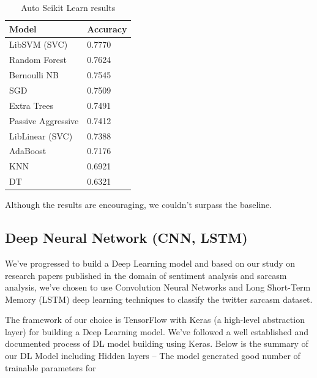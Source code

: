 \documentclass[conference]{IEEEtran}
\begin{document}
\begin{table}[htbp]
	\caption{Auto Scikit Learn results}
	\begin{center}
		\begin{tabular}{|l|l|}
			\hline
			\textbf{Model} & \textbf{Accuracy}\\ \hline
			LibSVM (SVC) & 0.7770 \\ \hline
			Random Forest & 0.7624 \\ \hline
			Bernoulli NB & 0.7545 \\ \hline
			SGD & 0.7509 \\ \hline
			Extra Trees & 0.7491 \\ \hline
			Passive Aggressive & 0.7412 \\ \hline
			LibLinear (SVC) & 0.7388 \\ \hline
			AdaBoost & 0.7176 \\ \hline
			KNN & 0.6921 \\ \hline
			DT & 0.6321 \\ \hline								
		\end{tabular}
		\label{tab2}
	\end{center}
\end{table}


Although the results are encouraging, we couldn’t surpass the baseline.

\subsection{Deep Neural Network (CNN, LSTM)}

We’ve progressed to build a Deep Learning model and based on our study on research papers published in the domain of sentiment analysis and sarcasm analysis, we’ve chosen to use Convolution Neural Networks and Long Short-Term Memory (LSTM) deep learning techniques to classify the twitter sarcasm dataset.

The framework of our choice is TensorFlow with Keras (a high-level abstraction layer) for building a Deep Learning model. We’ve followed a well established and documented process of DL model building using Keras. Below is the summary of our DL Model including Hidden layers – The model generated good number of trainable parameters for 
\end{document}
